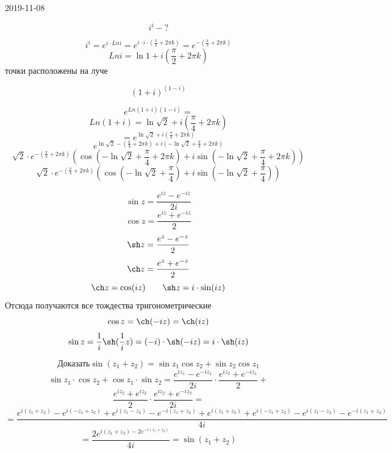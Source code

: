\documentclass[main.tex]{subfiles}
\begin{document}
\begin{lect}{2019-11-08}
    \begin{Task}[4]
        \[i^i - ?\]

        \[i^i = e^{i \cdot Ln i} = e^{i \cdot i \cdot (\frac{\pi}{2} + 2\pi k)} = 
        e^{-(\frac{\pi}{2}  +2\pi k)} \]
        \[Ln i = \ln 1 + i(\frac{\pi}{2} + 2\pi k)\]
        точки расположены на луче
    \end{Task}

    \begin{Task}[5]
        \[(1 + i)^{(1 - i)} \]

        \[e^{Ln (1 + i) (1 - i)} = \]
        \[Ln(1 + i) = \ln \sqrt{2} + i(\frac{\pi}{4} + 2\pi k)\]
        \[= e^{\ln \sqrt{2} + i(\frac{\pi}{4} + 2\pi k)} \]
        \[e^{\ln \sqrt{2} - (\frac{\pi}{4} + 2\pi k) + i(-\ln \sqrt{2} + \frac{\pi}{4} + 
        2\pi k)} \]
        \[\sqrt{2} \cdot e^{- (\frac{\pi}{4} + 2\pi k)}( \cos (-\ln \sqrt{2} + 
        \frac{\pi}{4} + 2\pi k) + i\sin(-\ln \sqrt{2} + 
    \frac{\pi}{4} + 2\pi k)) \]
    \[\sqrt{2} \cdot e^{- (\frac{\pi}{4} + 2\pi k)} (\cos (-\ln \sqrt{2} + \frac{\pi}{4}) 
    + i\sin(-\ln\sqrt{2} + \frac{\pi}{4})) \]
    \end{Task}

    \begin{Definition}
        \[\sin z = \frac{e^{iz} - e^{-iz}  }{2i}\]
        \[\cos z = \frac{e^{iz} + e^{-iz} }{2}\]
        \[\sh z = \frac{e^z - e^{-z} }{2}\]
        \[\ch z = \frac{e^z  + e^{-z} }{2}\]
        \[\ch z = \cos(iz) \qq \sh z = i \cdot \sin(iz)\]
        Отсюда получаются все тождества тригонометрические
        \[\cos z = \ch(-iz) = \ch(iz)\]
        \[\sin z = \frac{1}{i}\sh(\frac{1}{i}z) = (-i) \cdot \sh(-iz) = i \cdot \sh(iz)\]
    \end{Definition}

    \begin{Task}[6]
        \[\text{Доказать} \sin(z_1 + z_2) = \sin z_1 \cos z_2 + \sin z_2 \cos z_1\]
        \[\sin z_1 \cdot \cos z_2 + \cos z_1 \cdot \sin z_2 = 
        \frac{e^{iz_1} - e^{-iz_1}  }{2i} \cdot \frac{e^{iz_2} + e^{-iz_1} }{2} +\]
        \[\frac{e^{iz_2} + e^{iz_2}  }{2} \cdot \frac{e^{iz_2} + e^{-iz_2}  }{2i} =  \]
        \[= \frac{e^{i(z_1  + z_2)} - e^{i(-z_1 + z_2)} +
                e^{i(z_1 - z_2)} - e^{-i(z_1 + z_2)} + e^{i(z_1 + z_2)} + e^{i(-z_1 + z_2)} - 
e^{i(z_1 - z_2)} - e^{-i(z_1 + z_2)}  }  {4i}    \] %
\[= \frac{2e^{i(z_1 + z_2) - 2e^{-i(z_1 + z_2)} } }{4i} = \sin(z_1 + z_2)\]
    \end{Task}


\end{lect}
\end{document}
